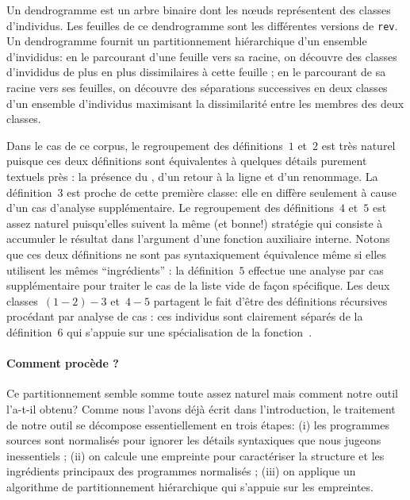 Un dendrogramme est un arbre binaire dont les n{\oe}uds représentent
des classes d'individus. Les feuilles de ce dendrogramme sont les
différentes versions de \texttt{rev}. Un dendrogramme fournit un
partitionnement hiérarchique d'un ensemble d'invididus: en le
parcourant d'une feuille vers sa racine, on découvre des classes
d'invididus de plus en plus dissimilaires à cette feuille ; en le
parcourant de sa racine vers ses feuilles, on découvre des séparations
successives en deux classes d'un ensemble d'individus maximisant
la dissimilarité entre les membres des deux classes.  

Dans le cas de ce corpus, le regroupement des définitions~$1$ et~$2$
est très naturel puisque ces deux définitions sont équivalentes à
quelques détails purement textuels près : la présence du \iocaml{|},
d'un retour à la ligne et d'un renommage. La définition~$3$ est proche
de cette première classe: elle en diffère seulement à cause d'un cas
d'analyse supplémentaire. Le regroupement des définitions~$4$ et~$5$
est assez naturel puisqu'elles suivent la même (et bonne!) stratégie
qui consiste à accumuler le résultat dans l'argument d'une fonction
auxiliaire interne. Notons que ces deux définitions ne sont pas
syntaxiquement équivalence même si elles utilisent les mêmes ``ingrédients'' :
la définition~$5$ effectue une analyse par cas supplémentaire pour
traiter le cas de la liste vide de façon spécifique. Les deux classes~$(1-2)-3$
et~$4-5$ partagent le fait d'être des définitions récursives procédant par
analyse de cas : ces individus sont clairement séparés de la définition~$6$
qui s'appuie sur une spécialisation de la fonction~.

\paragraph{Comment procède {\Asak}?}
Ce partitionnement semble somme toute assez naturel mais comment notre
outil l'a-t-il obtenu? Comme nous l'avons déjà écrit dans
l'introduction, le traitement de notre outil se décompose
essentiellement en trois étapes: (i) les programmes sources sont
normalisés pour ignorer les détails syntaxiques que nous jugeons
inessentiels ; (ii) on calcule une empreinte pour caractériser la
structure et les ingrédients principaux des programmes normalisés ;
(iii) on applique un algorithme de partitionnement hiérarchique qui
s'appuie sur les empreintes.

